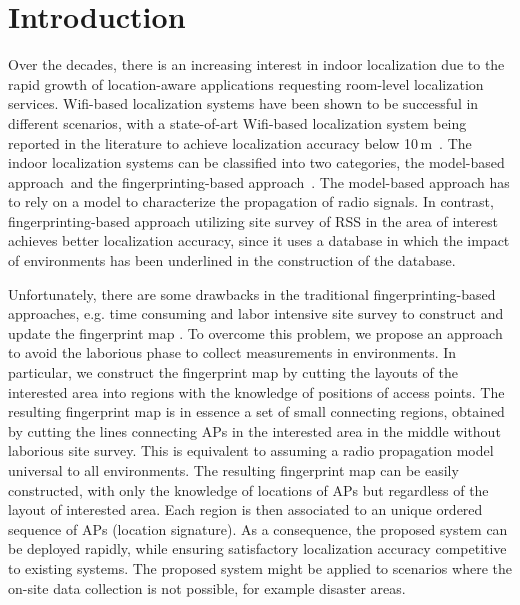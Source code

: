 \documentclass[10pt, conference, letterpaper]{IEEEtran}
\begin{document}
\IEEEpeerreviewmaketitle


\section{Introduction}
\label{section:introduction}

Over the decades, there is an increasing interest in indoor localization due to the rapid growth of location-aware applications requesting room-level localization services. 
Wifi-based localization systems have been shown to be successful in different scenarios, 
with a state-of-art Wifi-based localization system being reported in the literature to achieve localization accuracy below 10\,m \,\cite{Recent_advance_wireless}.
The indoor localization systems can be classified into two categories, the model-based approach\,\cite{Model_based_appraoch} and the fingerprinting-based approach\,\cite{fingerpringting_approach} \cite{Centaur}. 
The model-based approach has to rely on a model to characterize the propagation of radio signals. 
In contrast, fingerprinting-based approach utilizing site survey of RSS in the area of interest achieves better localization accuracy, 
since it uses a database in which the impact of environments has been underlined in the construction of the database. 

Unfortunately, there are some drawbacks in the traditional fingerprinting-based approaches, e.g. time consuming and labor intensive site survey to construct and update the fingerprint map \cite{Mo_loc} \cite{Crowdsourcing}. To overcome this problem, 
we propose an approach to avoid the laborious phase to collect measurements in environments. 
In particular, we construct the fingerprint map by cutting the layouts of the interested area into regions with the knowledge of positions of access points.
The resulting fingerprint map is in essence a set of small connecting regions, obtained by cutting the lines connecting APs in the interested area in the middle without laborious site survey. 
This is equivalent to assuming a radio propagation model universal to all environments. 
The resulting fingerprint map can be easily constructed, with only the knowledge of locations of APs but regardless of the layout of interested area. 
Each region is then associated to an unique ordered sequence of APs (location signature). 
As a consequence, the proposed system can be deployed rapidly, while ensuring satisfactory localization accuracy competitive to existing systems. 
The proposed system might be applied to scenarios where the on-site data collection is not possible, for example disaster areas.
\end{document}
